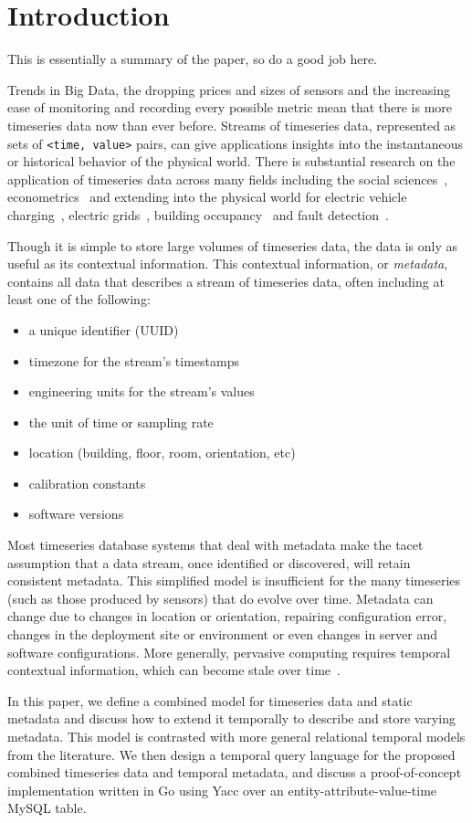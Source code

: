 \section{Introduction}

This is essentially a summary of the paper, so do a good job here.
\fi

Trends in Big Data, the dropping prices and sizes of sensors and the increasing
ease of monitoring and recording every possible metric mean that there is more
timeseries data now than ever before.  Streams of timeseries data, represented
as sets of \texttt{<time, value>} pairs, can give applications insights into
the instantaneous or historical behavior of the physical world.  There is
substantial research on the application of timeseries data across many fields
including the social sciences~\cite{mccleary1980applied},
econometrics~\cite{lutkepohl2004applied} and extending into the physical world
for electric vehicle charging~\cite{sortomme2011optimal}, electric
grids~\cite{carreras2004evidence}, building occupancy~\cite{richardson2008high}
and fault detection~\cite{fontugne2013strip}.

Though it is simple to store large volumes
of timeseries data, the data is only as useful as its contextual information.
This contextual information, or \emph{metadata}, contains all data that describes
a stream of timeseries data, often including at least one of the following:

\begin{itemize}
\item a unique identifier (UUID)
\item timezone for the stream's timestamps
\item engineering units for the stream's values
\item the unit of time or sampling rate
\item location (building, floor, room, orientation, etc)
\item calibration constants
\item software versions
\end{itemize}


Most timeseries database systems that deal with metadata  make the tacet
assumption that a data stream, once identified or discovered, will retain
consistent metadata. This simplified model is insufficient for the many
timeseries (such as those produced by sensors) that do evolve over time.
Metadata can change due to changes in location or orientation, repairing
configuration error, changes in the deployment site or environment or even
changes in server and software configurations. More generally, pervasive
computing requires temporal contextual information, which can become stale over
time~\cite{henricksen2002modeling}.

In this paper, we define a combined model for timeseries data and static
metadata and discuss how to extend it temporally to describe and store varying
metadata. This model is contrasted with more general relational temporal models
from the literature. We then design a temporal query language for the proposed
combined timeseries data and temporal metadata, and discuss a proof-of-concept
implementation written in Go using Yacc over an entity-attribute-value-time MySQL
table.
